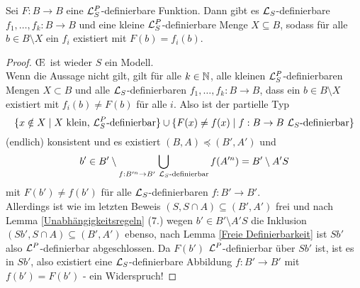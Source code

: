 \begin{lemma}
	Sei $F:B\rightarrow B$ eine $\mathcal{L}^P_S$-definierbare Funktion. Dann gibt es $\mathcal{L}_S$-definierbare $f_1,\dots,f_k:B\rightarrow B$ und eine kleine $\mathcal{L}^P_S$-definierbare Menge $X\subseteq B$, sodass für alle $b\in B\setminus X$ ein $f_i$ existiert mit $F(b)=f_i(b)$.
\end{lemma}
\begin{proof}
	\OE\ ist wieder $S$ ein Modell.\\
	Wenn die Aussage nicht gilt, gilt für alle $k\in\mathbb{N}$, alle kleinen $\mathcal{L}^P_S$-definierbaren Mengen $X\subset B$ und alle $\mathcal{L}_S$-definierbaren $f_1,\dots,f_k:B\rightarrow B$, dass ein $b\in B\setminus X$ existiert mit $f_i(b)\neq F(b)$ für alle $i$. Also ist der partielle Typ $$\{x\notin X\mid X\text{ klein, }\mathcal{L}^P_S\text{-definierbar}\}\cup\{F(x)\neq f(x)\mid f:B\rightarrow B\ \mathcal{L}_S\text{-definierbar}\}$$ (endlich) konsistent und es existiert $(B,A)\preceq(B',A')$ und $$b'\in B'\setminus\bigcup\limits_{f:B'^n\rightarrow B'\ \lingua_S\text{-definierbar}}f(A'^n)=B'\setminus A'S$$ mit $F(b')\neq f(b')$ für alle $\mathcal{L}_S$-definierbaren $f:B'\rightarrow B'$.\\
	Allerdings ist wie im letzten Beweis $(S,S\cap A)\subseteq(B',A')$ frei und nach Lemma \ref{Unabhängigkeitsregeln} (7.) wegen $b'\in B'\setminus A'S$ die Inklusion $(Sb',S\cap A)\subseteq(B',A')$ ebenso, nach Lemma \ref{Freie Definierbarkeit} ist $Sb'$ also $\mathcal{L}^P$-definierbar abgeschlossen. Da $F(b')$ $\mathcal{L}^P$-definierbar über $Sb'$ ist, ist es in $Sb'$, also existiert eine $\mathcal{L}_S$-definierbare Abbildung $f:B'\rightarrow B'$ mit $f(b')=F(b')$ - ein Widerspruch!
\end{proof}

